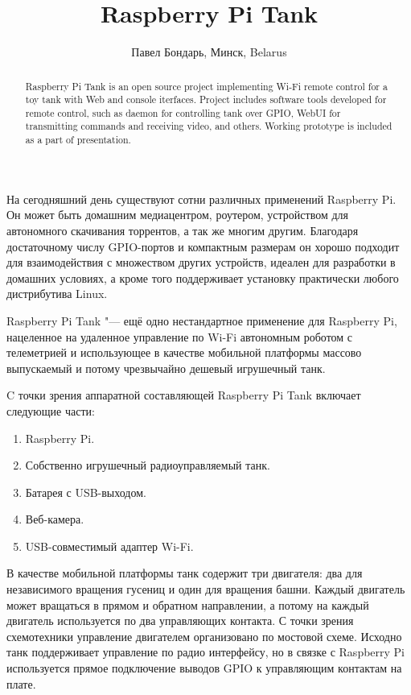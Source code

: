 \documentclass[10pt, a5paper]{article}
\begin{document}
\title{Raspberry Pi Tank}
\author{Павел Бондарь, Минск, Belarus}
\maketitle
\begin{abstract}
Raspberry Pi Tank is an open source project implementing Wi-Fi remote control for a toy tank with Web and console iterfaces. Project includes software tools developed for remote control, such as daemon for controlling tank over GPIO,  WebUI for transmitting commands and receiving video, and others. Working prototype is included as a part of presentation.
\end{abstract}
На сегодняшний день существуют сотни различных применений Raspberry Pi. Он может быть домашним медиацентром, роутером, устройством для автономного скачивания торрентов, а так же многим другим. Благодаря достаточному числу GPIO-портов и компактным размерам он хорошо подходит для взаимодействия с множеством других устройств, идеален для разработки в домашних условиях, а кроме того поддерживает установку практически любого дистрибутива Linux.

Raspberry Pi Tank "--- ещё одно нестандартное применение для Raspberry Pi, нацеленное на удаленное управление по Wi-Fi автономным роботом с телеметрией и использующее в качестве мобильной платформы массово выпускаемый и потому чрезвычайно дешевый игрушечный танк.

C точки зрения аппаратной составляющей Raspberry Pi Tank включает следующие части:

\begin{enumerate}
  \item Raspberry Pi.
  \item Собственно игрушечный радиоуправляемый танк.
  \item Батарея с USB-выходом.
  \item Веб-камера.
  \item USB-совместимый адаптер Wi-Fi.
\end{enumerate}

В качестве мобильной платформы танк содержит три двигателя: два для независимого вращения гусениц и один для вращения башни. Каждый двигатель может вращаться в прямом и обратном направлении, а потому на каждый двигатель используется по два управляющих контакта. С точки зрения схемотехники управление двигателем организовано по мостовой схеме.
Исходно танк поддерживает управление по радио интерфейсу, но в связке с Raspberry Pi используется прямое подключение выводов GPIO к управляющим контактам на плате.
\end{document}

